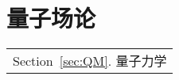 \part{量子场论}\label{Part:QFT}
	\begin{margintable}\vspace{1.4in}\footnotesize
		\begin{tabularx}{\marginparwidth}{|X}
		Section~\ref{sec:QM}. 量子力学\\
		\end{tabularx}
	\end{margintable}
	